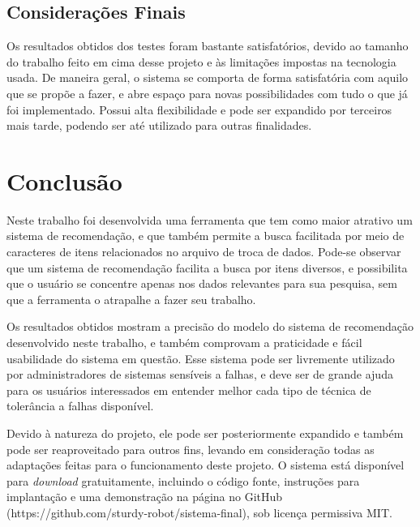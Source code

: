 \documentclass[
	12pt,				%
	oneside,			%
	a4paper,			%
	chapter=TITLE,		%
	english,			%
	french,				%
	spanish,			%
	brazil				%
	]{abntex2}
\begin{document}
\section{Considerações Finais}

Os resultados obtidos dos testes foram bastante satisfatórios, devido ao tamanho do trabalho feito em cima desse projeto e às limitações impostas na tecnologia usada. De maneira geral, o sistema se comporta de forma satisfatória com aquilo que se propõe a fazer, e abre espaço para novas possibilidades com tudo o que já foi implementado. Possui alta flexibilidade e pode ser expandido por terceiros mais tarde, podendo ser até utilizado para outras finalidades.



\chapter{Conclusão} \label{cap_conclusão}

Neste trabalho foi desenvolvida uma ferramenta que tem como maior atrativo um sistema de recomendação, e que também permite a busca facilitada por meio de caracteres de itens relacionados no arquivo de troca de dados. Pode-se observar que um sistema de recomendação facilita a busca por itens diversos, e possibilita que o usuário se concentre apenas nos dados relevantes para sua pesquisa, sem que a ferramenta o atrapalhe a fazer seu trabalho.

Os resultados obtidos mostram a precisão do modelo do sistema de recomendação desenvolvido neste trabalho, e também comprovam a praticidade e fácil usabilidade do sistema em questão. Esse sistema pode ser livremente utilizado por administradores de sistemas sensíveis a falhas, e deve ser de grande ajuda para os usuários interessados em entender melhor cada tipo de técnica de tolerância a falhas disponível.

Devido à natureza do projeto, ele pode ser posteriormente expandido e também pode ser reaproveitado para outros fins, levando em consideração todas as adaptações feitas para o funcionamento deste projeto. O sistema está disponível para \emph{download} gratuitamente, incluindo o código fonte, instruções para implantação e uma demonstração na página no GitHub (https://github.com/sturdy-robot/sistema-final), sob licença permissiva MIT.
\end{document}

